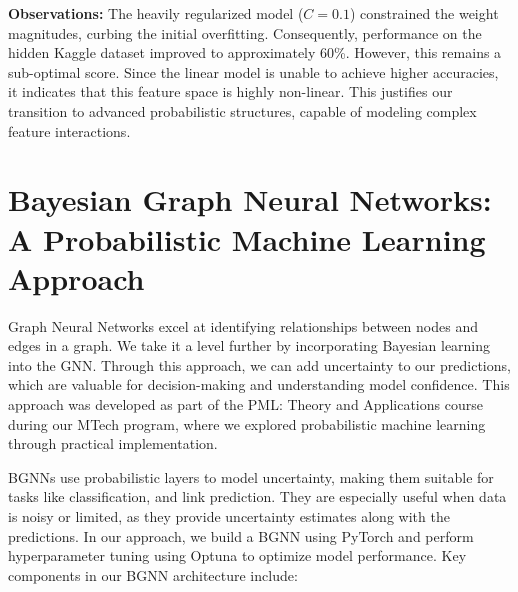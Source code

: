 \documentclass[11pt,a4paper]{article}
\begin{document}
\textbf{Observations:} The heavily regularized model ($C=0.1$) constrained the weight magnitudes, curbing the initial overfitting. Consequently, performance on the hidden Kaggle dataset improved to approximately 60\%. However, this remains a sub-optimal score. Since the linear model is unable to achieve higher accuracies, it indicates that this feature space is highly non-linear. This justifies our transition to advanced probabilistic structures, capable of modeling complex feature interactions.

\section{Bayesian Graph Neural Networks: A Probabilistic Machine Learning Approach}

Graph Neural Networks excel at identifying relationships between nodes and edges in a graph. We take it a level further by incorporating Bayesian learning into the GNN. Through this approach, we can add uncertainty to our predictions, which are valuable for decision-making and understanding model confidence. This approach was developed as part of the PML: Theory and Applications course during our MTech program, where we explored probabilistic machine learning through practical implementation.

BGNNs use probabilistic layers to model uncertainty, making them suitable for tasks like classification, and link prediction. They are especially useful when data is noisy or limited, as they provide uncertainty estimates along with the predictions. In our approach, we build a BGNN using PyTorch and perform hyperparameter tuning using Optuna to optimize model performance. Key components in our BGNN architecture include:
\end{document}
